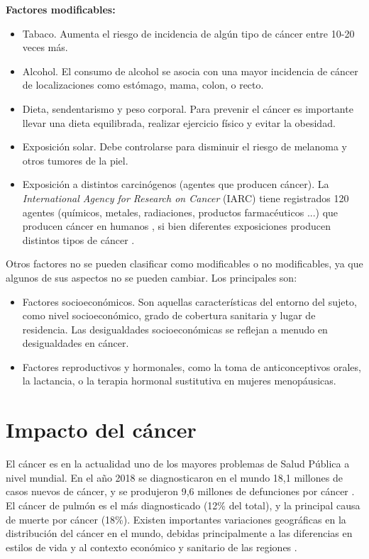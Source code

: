 \textbf{Factores modificables:}
\begin{itemize}
	\item Tabaco. Aumenta el riesgo de incidencia de algún tipo de cáncer entre 10-20 veces más.
	\item Alcohol. El consumo de alcohol se asocia con una mayor incidencia de cáncer de localizaciones como estómago, mama, colon, o recto.
	\item Dieta, sendentarismo y peso corporal. Para prevenir el cáncer es importante llevar una dieta equilibrada, realizar ejercicio físico y evitar la obesidad.
	\item Exposición solar. Debe controlarse para disminuir el riesgo de melanoma y otros tumores de la piel.
	\item Exposición a distintos carcinógenos (agentes que producen cáncer). La \textit{International Agency for Research on Cancer} (IARC) tiene registrados 120 agentes (químicos, metales, radiaciones, productos farmacéuticos  ...) que  producen cáncer en humanos \cite{InternationalAgencyforResearchonCancer2019}, si bien diferentes exposiciones producen distintos tipos de cáncer \cite{Cogliano2011}.
\end{itemize}

\noindent Otros factores no se pueden clasificar como modificables o no modificables, ya que algunos de sus aspectos no se pueden cambiar. Los principales son:

\begin{itemize}
	\item Factores socioeconómicos. Son aquellas características del entorno del sujeto, como nivel socioeconómico, grado de cobertura sanitaria y lugar de residencia. Las desigualdades socioeconómicas se reflejan a menudo en desigualdades en cáncer.
	\item Factores reproductivos y hormonales, como la toma de anticonceptivos orales, la lactancia, o la terapia hormonal sustitutiva en mujeres menopáusicas.
\end{itemize}

\section{Impacto del cáncer}

El cáncer es en la actualidad uno de los mayores problemas de Salud Pública a nivel mundial. En el año 2018 se diagnosticaron en el mundo 18,1 millones de casos nuevos de cáncer, y se produjeron 9,6 millones de defunciones por cáncer \cite{Bray2018}. El cáncer de pulmón es el más diagnosticado (12\% del total), y la principal causa de muerte por cáncer (18\%). Existen importantes variaciones geográficas en la distribución del cáncer en el mundo, debidas principalmente a las diferencias en estilos de vida y al contexto económico y sanitario de las regiones \cite{Bray2018}.\\

